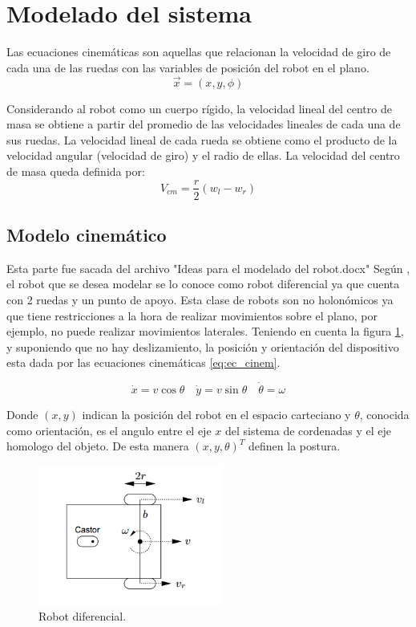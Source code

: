\documentclass[10pt,conference,a4paper,onecolumn]{article}%
\begin{document}
\section{Modelado del sistema}
Las ecuaciones cinemáticas son aquellas que relacionan la velocidad de giro de cada una de las ruedas con las variables de posición del robot en el plano.
\begin{equation}
\vec{x}= (x,y,\phi )
\end{equation}
 
Considerando al robot como un cuerpo rígido, la velocidad lineal del centro de masa se obtiene a partir del promedio de las velocidades lineales de cada una de sus
ruedas. La velocidad lineal de cada rueda se obtiene como el producto de la velocidad angular (velocidad de giro) y el radio de ellas. La velocidad del centro de masa
queda definida por:
\begin{equation}
V_{cm}= \frac{r}{2} (w_l-w_r) 
\end{equation}



\subsection{Modelo cinemático}

Esta parte fue sacada del archivo "Ideas para el modelado del robot.docx"
Según \cite{pathfoll}, el robot que se desea modelar se lo conoce como robot diferencial ya que cuenta con 2 ruedas y un punto de apoyo. Esta clase de robots son no holonómicos ya que tiene restricciones a la hora de realizar movimientos sobre el plano, por ejemplo, no puede realizar movimientos laterales. Teniendo en cuenta la figura \ref{fig:robot_diferencial}, y suponiendo que no hay deslizamiento, la posición y orientación del dispositivo  esta dada por las ecuaciones cinemáticas \ref{eq:ec_cinem}.

\begin{equation}
\dot{x}=v\cos\theta \quad \dot{y}=v\sin\theta \quad \dot{\theta}=\omega
\label{eq:ec_cinem}
\end{equation}

Donde $(x,y)$ indican la posición del robot en el espacio carteciano y $\theta $, conocida como orientación, es el angulo entre el eje $x$ del sistema de cordenadas y el eje homologo del objeto.  De esta manera $(x,y,\theta)^T$ definen la postura.

\begin{figure}[h]
\centering
\includegraphics[width=6cm]{./imagenes/robot_diferencial.png}
\caption{Robot diferencial. }%
\label{fig:robot_diferencial}
\end{figure}
\end{document}
